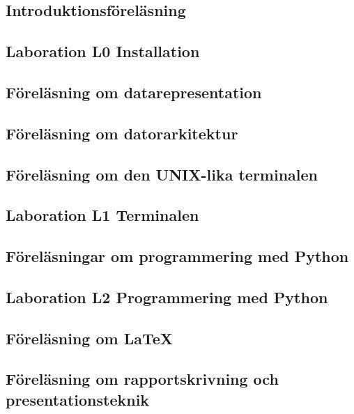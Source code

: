 \documentclass[a4paper,logo]{miunart}
\begin{document}
\subsection{Introduktionsföreläsning}


\subsection{Laboration L0 Installation}


\subsection{Föreläsning om datarepresentation}


\subsection{Föreläsning om datorarkitektur}


\subsection{Föreläsning om den UNIX-lika terminalen}


\subsection{Laboration L1 Terminalen}


\subsection{Föreläsningar om programmering med Python}


\subsection{Laboration L2 Programmering med Python}


\subsection{Föreläsning om \LaTeX}


\subsection{Föreläsning om rapportskrivning och presentationsteknik}

\end{document}
